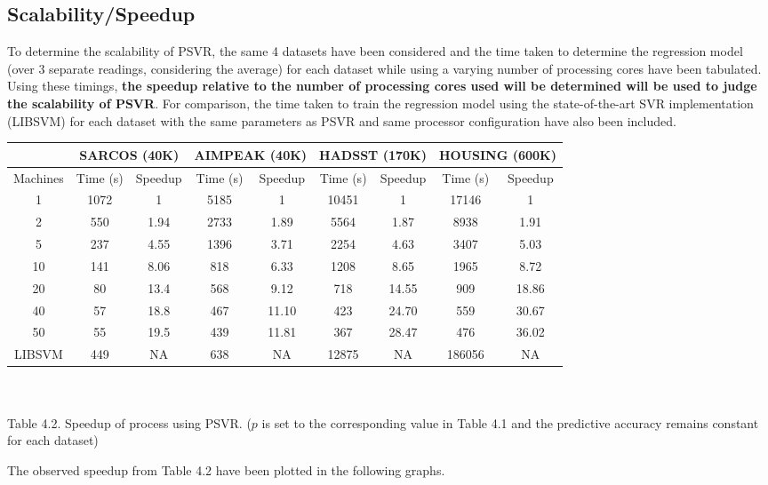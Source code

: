 \documentclass[12pt]{article}
\begin{document}
\subsection{Scalability/Speedup}
\label{Scalability/Speedup}
To determine the scalability of PSVR, the same 4 datasets have been considered and the time taken to determine the regression model (over 3 separate readings, considering the average) for each dataset while using a varying number of processing cores have been tabulated. Using these timings, {\bf the speedup relative to the number of processing cores used will be determined will be used to judge the scalability of PSVR}. For comparison, the time taken to train the regression model using the state-of-the-art SVR implementation (LIBSVM) for each dataset with the same parameters as PSVR and same processor configuration have also been included. 
\begin{center}
\begin{tabular}{ |c|c|c|c|c|c|c|c|c| }
  \hline
   &  \multicolumn{2}{|c|}{SARCOS (40K)} &  \multicolumn{2}{|c|}{AIMPEAK (40K)} & \multicolumn{2}{|c|}{HADSST (170K)}  &  \multicolumn{2}{|c|}{HOUSING (600K)} \\
  \hline
  Machines & Time (s) & Speedup & Time (s) & Speedup & Time (s) & Speedup & Time (s) & Speedup\\
  \hline
  1 & 1072& 1& 5185 & 1&10451 & 1 &17146 & 1 \\
  2 & 550 & 1.94 & 2733 & 1.89 & 5564 & 1.87& 8938 &1.91  \\
  5 & 237 & 4.55 & 1396& 3.71 & 2254 & 4.63 & 3407 & 5.03  \\
  10 & 141& 8.06 & 818 & 6.33 & 1208 & 8.65 & 1965& 8.72\\
  20 & 80& 13.4 & 568 & 9.12& 718 & 14.55 & 909 &  18.86  \\
  40 & 57& 18.8 & 467 & 11.10& 423 & 24.70 & 559& 30.67  \\
  50 & 55 & 19.5 & 	439 & 11.81& 367 & 28.47 & 476 & 36.02 \\
  \hline
  LIBSVM & 449 & NA& 638 & NA & 12875 & NA &186056 & NA\\
  \hline
\end{tabular}
\ \\
\ \\
Table 4.2. Speedup of process using PSVR. ($p$ is set to the corresponding value in Table 4.1 and the predictive accuracy remains constant for each dataset)
\end{center}
The observed speedup from Table 4.2 have been plotted in the following graphs.
\end{document}
